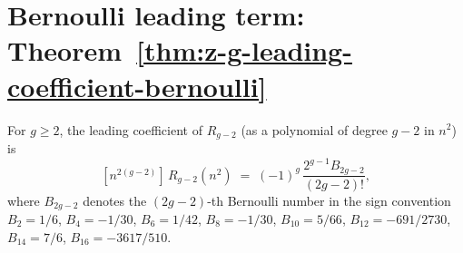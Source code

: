 \section{Bernoulli leading term: Theorem~\ref{thm:z-g-leading-coefficient-bernoulli}}

\begin{theorem}
\label{thm:z-g-leading-coefficient-bernoulli}
\ClaimStatusProvedHere
For $g \ge 2$, the leading coefficient of $R_{g-2}$ (as a polynomial of degree
$g-2$ in $n^2$) is
\begin{equation}
\label{eq:leading-coeff}
[n^{2(g-2)}]\,R_{g-2}(n^2)
\;=\;
(-1)^g\,\frac{2^{g-1}B_{2g-2}}{(2g-2)!},
\end{equation}
where $B_{2g-2}$ denotes the $(2g-2)$-th Bernoulli number in the sign
convention $B_2 = 1/6$, $B_4 = -1/30$, $B_6 = 1/42$, $B_8 = -1/30$,
$B_{10} = 5/66$, $B_{12} = -691/2730$, $B_{14} = 7/6$,
$B_{16} = -3617/510$.
\end{theorem}

